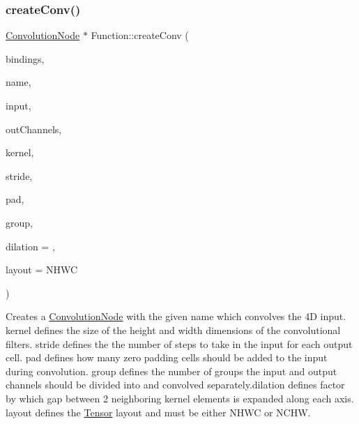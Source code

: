 \subsubsection{\texorpdfstring{create\+Conv()}{createConv()}\hspace{0.1cm}{\footnotesize\ttfamily [4/4]}}
{\footnotesize\ttfamily \hyperlink{classglow_1_1_convolution_node}{Convolution\+Node} $\ast$ Function\+::create\+Conv (\begin{DoxyParamCaption}\item[{\hyperlink{classglow_1_1_placeholder_bindings}{Placeholder\+Bindings} \&}]{bindings,  }\item[{llvm\+::\+String\+Ref}]{name,  }\item[{\hyperlink{structglow_1_1_node_value}{Node\+Value}}]{input,  }\item[{size\+\_\+t}]{out\+Channels,  }\item[{\hyperlink{namespaceglow_a0ca574644e1e42ef193a9947fb4d8911}{unsigned\+\_\+t}}]{kernel,  }\item[{\hyperlink{namespaceglow_a0ca574644e1e42ef193a9947fb4d8911}{unsigned\+\_\+t}}]{stride,  }\item[{\hyperlink{namespaceglow_a0ca574644e1e42ef193a9947fb4d8911}{unsigned\+\_\+t}}]{pad,  }\item[{\hyperlink{namespaceglow_a0ca574644e1e42ef193a9947fb4d8911}{unsigned\+\_\+t}}]{group,  }\item[{\hyperlink{namespaceglow_a0ca574644e1e42ef193a9947fb4d8911}{unsigned\+\_\+t}}]{dilation = {},  }\item[{\hyperlink{namespaceglow_aa2f3a33e05699df0f42295c5c4bd1f77}{Convolution\+Layout}}]{layout = {\ttfamily NHWC} }\end{DoxyParamCaption})}

Creates a \hyperlink{classglow_1_1_convolution_node}{Convolution\+Node} with the given {\ttfamily name} which convolves the 4D {\ttfamily input}. {\ttfamily kernel} defines the size of the height and width dimensions of the convolutional filters. {\ttfamily stride} defines the the number of steps to take in the input for each output cell. {\ttfamily pad} defines how many zero padding cells should be added to the input during convolution. {\ttfamily group} defines the number of groups the input and output channels should be divided into and convolved separately.{\ttfamily dilation} defines factor by which gap between 2 neighboring kernel elements is expanded along each axis. {\ttfamily layout} defines the \hyperlink{classglow_1_1_tensor}{Tensor} layout and must be either N\+H\+WC or N\+C\+HW. \mbox{\label{classglow_1_1_function_a5eec756ea2779f3768102cd496cce846}} 
